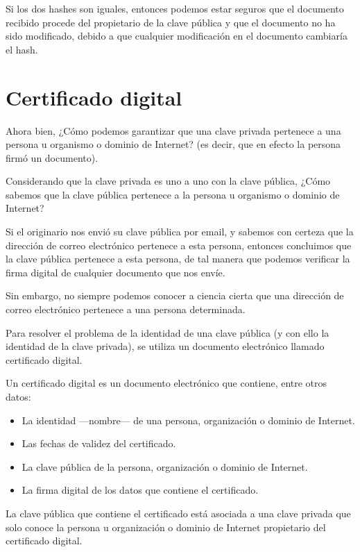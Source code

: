 \documentclass[11pt,a4paper,oneside]{book}
\begin{document}
Si los dos hashes son iguales, entonces podemos estar seguros que el documento recibido procede del propietario de la clave pública y que el documento no ha sido modificado, debido a que cualquier modificación en el documento cambiaría el hash.

\section{Certificado digital}

Ahora bien, ¿Cómo podemos garantizar que una clave privada pertenece a una persona u organismo o dominio de Internet? (es decir, que en efecto la persona firmó un documento). 

Considerando que la clave privada es uno a uno con la clave pública, ¿Cómo sabemos que la clave pública pertenece a la persona u organismo o dominio de Internet?

Si el originario nos envió su clave pública por email, y sabemos con certeza que la dirección de correo electrónico pertenece a esta persona, entonces concluimos que la clave pública pertenece a esta persona, de tal manera que podemos verificar la firma digital de cualquier documento que nos envíe.

Sin embargo, no siempre podemos conocer a ciencia cierta que una dirección de correo electrónico pertenece a una persona determinada.

Para resolver el problema de la identidad de una clave pública (y con ello la identidad de la clave privada), se utiliza un documento electrónico llamado certificado digital.

Un certificado digital es un documento electrónico que contiene, entre otros datos:

\begin{itemize}

\item La identidad —nombre— de una persona, organización o dominio de Internet.

\item Las fechas de validez del certificado.

\item La clave pública de la persona, organización o dominio de Internet.

\item La firma digital de los datos que contiene el certificado.

\end{itemize}

La clave pública que contiene el certificado está asociada a una clave privada que solo conoce la persona u organización o dominio de Internet propietario del certificado digital.
\end{document}
